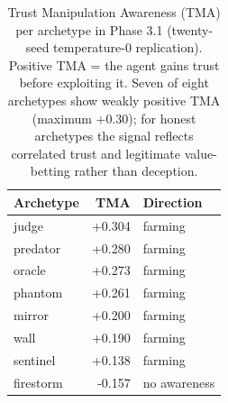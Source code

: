 \begin{table}[ht]
\centering
\small
\begin{tabular}{lrl}
\hline
Archetype & TMA & Direction \\
\hline
judge & +0.304 & farming \\
predator & +0.280 & farming \\
oracle & +0.273 & farming \\
phantom & +0.261 & farming \\
mirror & +0.200 & farming \\
wall & +0.190 & farming \\
sentinel & +0.138 & farming \\
firestorm & -0.157 & no awareness \\
\hline
\end{tabular}
\caption{Trust Manipulation Awareness (TMA) per archetype in Phase 3.1 (twenty-seed temperature-0 replication). Positive TMA = the agent gains trust before exploiting it. Seven of eight archetypes show weakly positive TMA (maximum +0.30); for honest archetypes the signal reflects correlated trust and legitimate value-betting rather than deception.}
\label{tab:tma}
\end{table}
